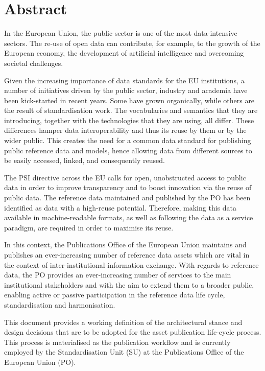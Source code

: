 \section*{Abstract}

    In the European Union, the public sector is one of the most data-intensive sectors. The re-use of open data can contribute, for example, to the growth of the European economy, the development of artificial intelligence and overcoming societal challenges.

	Given the increasing importance of data standards for the EU institutions, a number of initiatives driven by the public sector, industry and academia have been kick-started in recent years. Some have grown organically, while others are the result of standardisation work. The vocabularies and semantics that they are introducing, together with the technologies that they are using, all differ. These differences hamper data interoperability and thus its reuse by them or by the wider public. This creates the need for a common data standard for publishing public reference data and models, hence allowing data from different sources to be easily accessed, linked, and consequently reused.
	
	The PSI directive across the EU calls for open, unobstructed access to public data in order to improve transparency and to boost innovation via the reuse of public data. The reference data maintained and published by the PO has been identified as data with a high-reuse potential. Therefore, making this data available in machine-readable formats, as well as following the data as a service paradigm, are required in order to maximise its reuse.
	
	In this context, the Publications Office of the European Union maintains and publishes an ever-increasing number of reference data assets which are vital in the context of inter-institutional information exchange. With regards to reference data, the PO provides an ever-increasing number of services to the main institutional stakeholders and with the aim to extend them to a broader public, enabling active or passive participation in the reference data life cycle, standardisation and harmonisation.
	
	This document provides a working definition of the architectural stance and design decisions that are to be adopted for the asset publication life-cycle process. This process is materialised as the publication workflow and is currently employed by the Standardisation Unit (SU) at the Publications Office of the European Union (PO).
	
